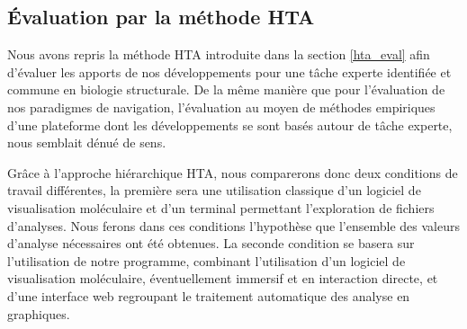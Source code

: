 \subsection{Évaluation par la méthode HTA}

Nous avons repris la méthode HTA introduite dans la section \ref{hta_eval} afin d'évaluer les apports de nos développements pour une tâche experte identifiée et commune en biologie structurale. De la même manière que pour l'évaluation de nos paradigmes de navigation, l'évaluation au moyen de méthodes empiriques d'une plateforme dont les développements se sont basés autour de tâche experte, nous semblait dénué de sens.

Grâce à l'approche hiérarchique HTA, nous comparerons donc deux conditions de travail différentes, la première sera une utilisation classique d'un logiciel de visualisation moléculaire et d'un terminal permettant l'exploration de fichiers d'analyses. Nous ferons dans ces conditions l'hypothèse que l'ensemble des valeurs d'analyse nécessaires ont été obtenues.
La seconde condition se basera sur l'utilisation de notre programme, combinant l'utilisation d'un logiciel de visualisation moléculaire, éventuellement immersif et en interaction directe, et d'une interface web regroupant le traitement automatique des analyse en graphiques.
\\
\\
